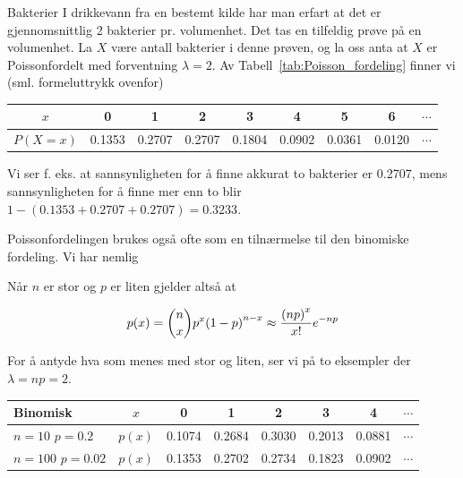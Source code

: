 \begin{eksempel}{Bakterier}
I drikkevann fra en bestemt kilde har man erfart at det er
gjennomsnittlig 2 bakterier pr. volumenhet. Det tas en tilfeldig
prøve på en volumenhet. La $X$ være antall bakterier i denne
prøven, og la oss anta at $X$ er Poissonfordelt med forventning
$\lambda =2$. Av Tabell~\ref{tab:Poisson_fordeling} finner vi (sml. formeluttrykk ovenfor)

\begin{center} \small \addtolength{\tabcolsep}{-0.5\tabcolsep}
\begin{tabular}{c|cccccccc}
    $x$  &  0  &  1   &   2  &  3  &  4  &  5  &  6  & $\cdots$  \\ \hline
 $P(X=x)$&0.1353&0.2707&0.2707&0.1804&0.0902&0.0361&0.0120&$\cdots$
\end{tabular}
\end{center}
\noindent Vi ser f. eks. at sannsynligheten for å finne akkurat to
bakterier er 0.2707, mens sannsynligheten for å finne mer enn
to blir $1 - (0.1353 + 0.2707 + 0.2707) = 0.3233$.
\end{eksempel}

\noindent Poissonfordelingen brukes også ofte som en tilnærmelse til
 den binomiske fordeling. Vi har nemlig

\begin{center}  \end{center}
\noindent Når $n$ er stor og $p$ er liten gjelder altså at

\[ p(x)={{n}\choose{x}}p^x{(1-p)}^{n-x} \approx
                  \frac{{(np)}^x}{x!} e^{-np} \]

\noindent For å antyde hva som menes med stor og liten, ser vi på to
eksempler der $\lambda =np=2$.

\begin{center} \small
\begin{tabular}{lc|cccccc}
 Binomisk   & $x$  &  0  &  1   &   2  &  3  &  4  &  $\cdots$  \\ \hline
 $n=10$ $p=0.2$ &$p(x)$&0.1074&0.2684&0.3030&0.2013&0.0881&$\cdots$ \\
 $n=100$ $p=0.02$ &$p(x)$&0.1353&0.2702&0.2734&0.1823&0.0902&$\cdots$
\end{tabular}
\end{center}

